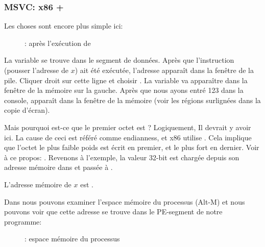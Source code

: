 \clearpage
\subsubsection{MSVC: x86 + \olly}
\myindex{\olly}

Les choses sont encore plus simple ici:

\begin{figure}[H]
\centering
{}
\caption{\olly: après l'exécution de \scanf}
\label{fig:scanf_ex2_olly_1}
\end{figure}

La variable se trouve dans le segment de données.
Après que l'instruction \PUSH (pousser l'adresse de $x$) ait été exécutée,
l'adresse apparaît dans la fenêtre de la pile. Cliquer droit sur cette ligne
et choisir . %
La variable va apparaître dans la fenêtre de la mémoire sur la gauche.
Après que nous ayons entré 123 dans la console,  apparaît dans la fenêtre
de la mémoire (voir les régions surlignées dans la copie d'écran).

Mais pourquoi est-ce que le premier octet est ?
Logiquement, Il devrait y avoir  ici.
La cause de ceci est référé comme \gls{endianness}, et x86 utilise .
Cela implique que l'octet le plus faible poids est écrit en premier, et le plus fort
en dernier.
Voir à ce propos: .
Revenons à l'exemple, la valeur 32-bit est chargée depuis son adresse mémoire
dans \EAX et passée à \printf.

L'adresse mémoire de $x$ est .

\clearpage
Dans \olly nous pouvons examiner l'espace mémoire du processus  (Alt-M) et nous
pouvons voir que cette adresse se trouve dans le PE-segment  de notre
programme:

\label{olly_memory_map_example}
\begin{figure}[H]
\centering
{}
\caption{\olly: espace mémoire du processus}
\label{fig:scanf_ex2_olly_2}
\end{figure}

